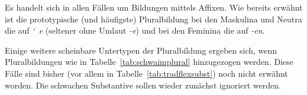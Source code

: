 \begin{table}[!htbp]
  \centering
  \caption{Übersicht über die Plural-Affixe mit Beispielen}
  \label{tab:plaffixe}
\end{table}

Es handelt sich in allen Fällen um Bildungen mittels Affixen.
Wie bereits erwähnt ist die prototypische (und häufigste) Pluralbildung bei den Maskulina und Neutra die auf \textit{\char`~e} (seltener ohne Umlaut \textit{-e}) und bei den Feminina die auf \textit{-en}.

Einige weitere scheinbare Untertypen der Pluralbildung ergeben sich, wenn Pluralbildungen wie in Tabelle~\ref{tab:schwaimplural} hinzugezogen werden.
Diese Fälle sind bisher (vor allem in Tabelle~\ref{tab:tradflexsubst}) noch nicht erwähnt worden.
Die schwachen Substantive sollen wieder zunächst ignoriert werden.

\begin{table}[!htbp]
  \centering
  \caption{Volle und um Schwa reduzierte Plural-Affixe}
  \label{tab:schwaimplural}
\end{table}

